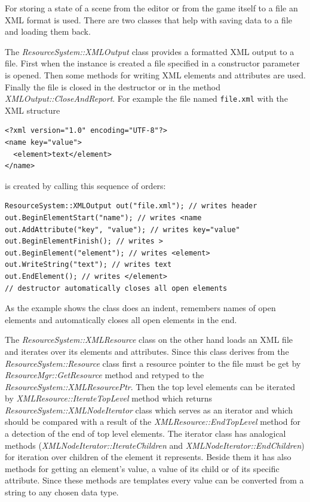 \documentclass[a4paper, 12pt]{report}
\begin{document}
For storing a state of a scene from the editor or from the game itself to a file an XML format is used. There are two classes that help with saving data to a file and loading them back.

The \emph{ResourceSystem::XMLOutput} class provides a formatted XML output to a file. First when the instance is created a file specified in a constructor parameter is opened. Then some methods for writing XML elements and attributes are used. Finally the file is closed in the destructor or in the method \emph{XMLOutput::CloseAndReport}. For example the file named \verb/file.xml/ with the XML structure

\begin{verbatim}
<?xml version="1.0" encoding="UTF-8"?>
<name key="value">
  <element>text</element>
</name>
\end{verbatim}

\noindent is created by calling this sequence of orders:

\begin{verbatim}
ResourceSystem::XMLOutput out("file.xml"); // writes header
out.BeginElementStart("name"); // writes <name
out.AddAttribute("key", "value"); // writes key="value"
out.BeginElementFinish(); // writes >
out.BeginElement("element"); // writes <element>
out.WriteString("text"); // writes text
out.EndElement(); // writes </element>
// destructor automatically closes all open elements
\end{verbatim}

\noindent As the example shows the class does an indent, remembers names of open elements and automatically closes all open elements in the end.

The \emph{ResourceSystem::XMLResource} class on the other hand loads an XML file and iterates over its elements and attributes. Since this class derives from the \emph{ResourceSystem::Resource} class first a resource pointer to the file must be get by \emph{ResourceMgr::GetResource} method and retyped to the \emph{ResourceSystem::XMLResourcePtr}. Then the top level elements can be iterated by \emph{XMLResource::IterateTopLevel} method which returns \emph{ResourceSystem::XMLNodeIterator} class which serves as an iterator and which should be compared with a result of the \emph{XMLResource::EndTopLevel} method for a detection of the end of top level elements. The iterator class has analogical methods (\emph{XMLNodeIterator::IterateChildren} and \emph{XMLNodeIterator::EndChildren}) for iteration over children of the element it represents. Beside them it has also methods for getting an element's value, a value of its child or of its specific attribute. Since these methods are templates every value can be converted from a string to any chosen data type.
\end{document}
